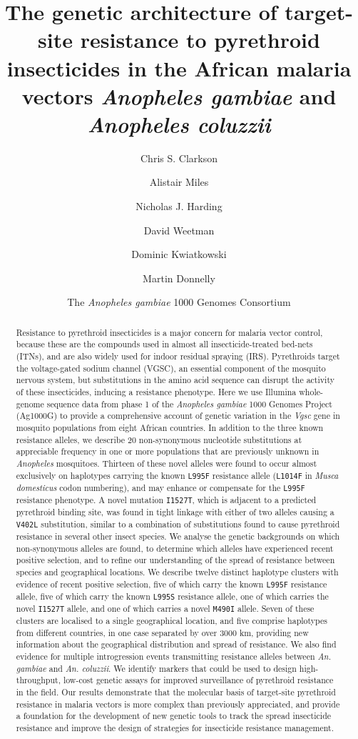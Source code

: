 \documentclass[a4paper,11pt,abstracton,hidelinks]{scrartcl}
\title{
The genetic architecture of target-site resistance to pyrethroid insecticides in the African malaria vectors \emph{Anopheles gambiae} and \emph{Anopheles coluzzii}
}
\author[1,*]{\small Chris S. Clarkson}
\author[2,1,*]{\small Alistair Miles}
\author[2]{\small Nicholas J. Harding}
\author[3]{\small David Weetman}
\author[1,2]{\small Dominic Kwiatkowski}
\author[3,1]{\small Martin Donnelly}
\author[4]{\small The \emph{Anopheles gambiae} 1000 Genomes Consortium}
\affil[1]{\footnotesize Wellcome Trust Sanger Institute, Hinxton, Cambridge CB10 1SA}
\affil[2]{\footnotesize Big Data Institute, University of Oxford, Li Ka Shing Centre for Health Information and Discovery, Old Road Campus, Oxford OX3 7LF}
\affil[3]{\footnotesize Liverpool School of Tropical Medicine, Pembroke Place, Liverpool L3 5QA}
\affil[4]{\footnotesize https://www.malariagen.net/projects/ag1000g\#people}
\affil[*]{\footnotesize These authors contributed equally}
\begin{document}
\maketitle


\begin{abstract}


Resistance to pyrethroid insecticides is a major concern for malaria vector control, because these are the compounds used in almost all insecticide-treated bed-nets (ITNs), and are also widely used for indoor residual spraying (IRS).
%
Pyrethroids target the voltage-gated sodium channel (VGSC), an essential component of the mosquito nervous system, but substitutions in the amino acid sequence can disrupt the activity of these insecticides, inducing a resistance phenotype.
%
Here we use Illumina whole-genome sequence data from phase 1 of the \emph{Anopheles gambiae} 1000 Genomes Project (Ag1000G) to provide a comprehensive account of genetic variation in the \emph{Vgsc} gene in mosquito populations from eight African countries.
%
In addition to the three known resistance alleles, we describe 20 non-synonymous nucleotide substitutions at appreciable frequency in one or more populations that are previously unknown in \textit{Anopheles} mosquitoes.
%
Thirteen of these novel alleles were found to occur almost exclusively on haplotypes carrying the known \texttt{L995F} resistance allele (\texttt{L1014F} in \textit{Musca domesticus} codon numbering), and may enhance or compensate for the \texttt{L995F} resistance phenotype.
%
A novel mutation \texttt{I1527T}, which is adjacent to a predicted pyrethroid binding site, was found in tight linkage with either of two alleles causing a \texttt{V402L} substitution, similar to a combination of substitutions found to cause pyrethroid resistance in several other insect species.
%
We analyse the genetic backgrounds on which non-synonymous alleles are found, to determine which alleles have experienced recent positive selection, and to refine our understanding of the spread of resistance between species and geographical locations.
%
We describe twelve distinct haplotype clusters with evidence of recent positive selection, five of which carry the known \texttt{L995F} resistance allele, five of which carry the known \texttt{L995S} resistance allele, one of which carries the novel \texttt{I1527T} allele, and one of which carries a novel \texttt{M490I} allele.
%
Seven of these clusters are localised to a single geographical location, and five comprise haplotypes from different countries, in one case separated by over 3000 km, providing new information about the geographical distribution and spread of resistance.
%
We also find evidence for multiple introgression events transmitting resistance alleles between \textit{An. gambiae} and \textit{An. coluzzii}.
%
We identify markers that could be used to design high-throughput, low-cost genetic assays for improved surveillance of pyrethroid resistance in the field.
%
Our results demonstrate that the molecular basis of target-site pyrethroid resistance in malaria vectors is more complex than previously appreciated, and provide a foundation for the development of new genetic tools to track the spread insecticide resistance and improve the design of strategies for insecticide resistance management.


\end{abstract}
\end{document}
